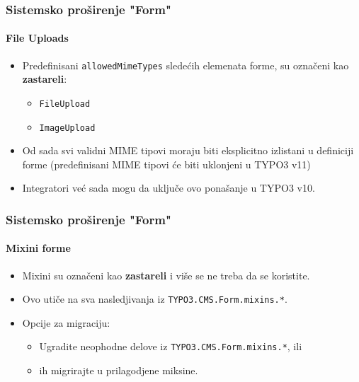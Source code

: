 
\begin{frame}[fragile]
	\frametitle{Sistemsko proširenje "Form"}
	\framesubtitle{File Uploads}

	\begin{itemize}
		\item Predefinisani \texttt{allowedMimeTypes} sledećih elemenata forme, su označeni kao \textbf{zastareli}:

			\begin{itemize}
				\item \texttt{FileUpload}
				\item \texttt{ImageUpload}
			\end{itemize}

		\item Od sada svi validni MIME tipovi moraju biti eksplicitno izlistani u definiciji forme\newline
			\smaller
				(predefinisani MIME tipovi će biti uklonjeni u TYPO3 v11)
			\normalsize

		\item Integratori već sada mogu da uključe ovo ponašanje u TYPO3 v10.

	\end{itemize}

\end{frame}


\begin{frame}[fragile]
	\frametitle{Sistemsko proširenje "Form"}
	\framesubtitle{Mixini forme}

	\begin{itemize}
		\item Mixini su označeni kao \textbf{zastareli} i više se ne treba da se koristite.
		\item Ovo utiče na sva nasledjivanja iz \texttt{TYPO3.CMS.Form.mixins.*}.
		\item Opcije za migraciju:

			\begin{itemize}
				\item Ugradite neophodne delove iz \texttt{TYPO3.CMS.Form.mixins.*}, ili
				\item ih migrirajte u prilagodjene miksine.
			\end{itemize}

	\end{itemize}

\end{frame}

